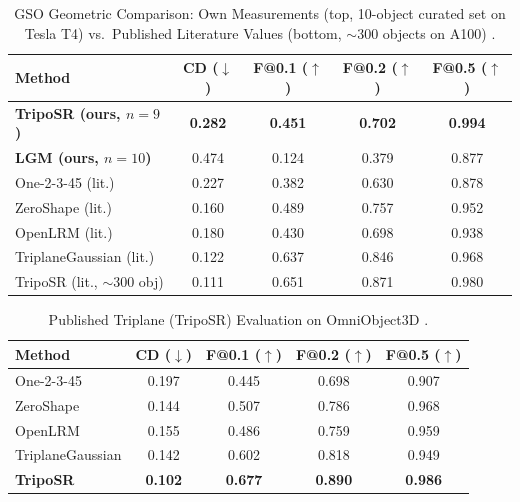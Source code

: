 \documentclass[10pt, conference]{IEEEtran}
\begin{document}
\begin{table}[ht]
\centering
\caption{GSO Geometric Comparison: Own Measurements (top, 10-object curated set on Tesla T4) vs.\ Published Literature Values (bottom, $\sim$300 objects on A100) \cite{triposr2024}.}
\label{tab:triposr_gso_own}
{\footnotesize\setlength{\tabcolsep}{2.5pt}
\begin{tabular}{lcccc}
\toprule
Method & CD ($\downarrow$) & F@0.1 ($\uparrow$) & F@0.2 ($\uparrow$) & F@0.5 ($\uparrow$) \\
\midrule
\textbf{TripoSR (ours, $n{=}9$)} & \textbf{0.282} & \textbf{0.451} & \textbf{0.702} & \textbf{0.994} \\
\textbf{LGM (ours, $n{=}10$)} & 0.474 & 0.124 & 0.379 & 0.877 \\
\midrule
One-2-3-45 \cite{one2345} (lit.) & 0.227 & 0.382 & 0.630 & 0.878 \\
ZeroShape \cite{zeroshape} (lit.) & 0.160 & 0.489 & 0.757 & 0.952 \\
OpenLRM \cite{openlrm2023} (lit.) & 0.180 & 0.430 & 0.698 & 0.938 \\
TriplaneGaussian (lit.) & 0.122 & 0.637 & 0.846 & 0.968 \\
TripoSR (lit., $\sim$300 obj) & 0.111 & 0.651 & 0.871 & 0.980 \\
\bottomrule
\end{tabular}}
\end{table}

\begin{table}[ht]
\centering
\caption{Published Triplane (TripoSR) Evaluation on OmniObject3D \cite{triposr2024}.}
\label{tab:triposr_omni}
{\footnotesize\setlength{\tabcolsep}{4pt}
\begin{tabular}{lcccc}
\toprule
Method & CD ($\downarrow$) & F@0.1 ($\uparrow$) & F@0.2 ($\uparrow$) & F@0.5 ($\uparrow$) \\
\midrule
One-2-3-45 \cite{one2345} & 0.197 & 0.445 & 0.698 & 0.907 \\
ZeroShape \cite{zeroshape} & 0.144 & 0.507 & 0.786 & 0.968 \\
OpenLRM \cite{openlrm2023} & 0.155 & 0.486 & 0.759 & 0.959 \\
TriplaneGaussian & 0.142 & 0.602 & 0.818 & 0.949 \\
\textbf{TripoSR} & \textbf{0.102} & \textbf{0.677} & \textbf{0.890} & \textbf{0.986} \\
\bottomrule
\end{tabular}}
\end{table}
\end{document}
